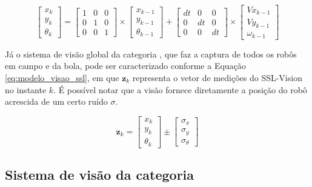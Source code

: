 \documentclass[acronym, symbols, table, deposito]{fei}
\begin{document}
		\begin{equation}\label{eq:modelo_sistema_ssl}
			\begin{bmatrix}
				x_k \\
				y_k \\
				\theta_k
			\end{bmatrix} = 
			\begin{bmatrix}
				1 & 0 & 0 \\
				0 & 1 & 0 \\
				0 & 0 & 1
			\end{bmatrix} \times
			\begin{bmatrix}
				x_{k-1} \\
				y_{k-1} \\
				\theta_{k-1}
			\end{bmatrix} + 
			\begin{bmatrix}
				dt & 0 & 0 \\
				0 & dt & 0 \\
				0 & 0 & dt
			\end{bmatrix} \times
			\begin{bmatrix}
				Vx_{k-1} \\
				Vy_{k-1} \\
				\omega_{k-1}
			\end{bmatrix}
		\end{equation}
		
		Já o sistema de visão global da categoria , que faz a captura de todos os robôs em campo e da bola, pode ser caracterizado conforme a Equação \eqref{eq:modelo_visao_ssl}, em que $\textbf{z}_{k}$ representa o vetor de medições do SSL-Vision no instante $k$. É possível notar que a visão fornece diretamente a posição do robô acrescida de um certo ruído $\sigma$.
		
		\begin{equation}\label{eq:modelo_visao_ssl}
			\textbf{z}_k  = 
			\begin{bmatrix}
				x_k \\
				y_k \\
				\theta_k
			\end{bmatrix} \pm
			\begin{bmatrix}
				\sigma_x \\
				\sigma_y \\
				\sigma_{\theta}
			\end{bmatrix}
		\end{equation}
		
		\subsection{Sistema de visão da categoria }
		
\end{document}
